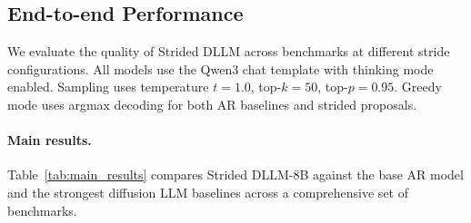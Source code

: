 \subsection{End-to-end Performance}
\label{sec:results}

We evaluate the quality of Strided DLLM across benchmarks at different stride configurations. All models use the Qwen3 chat template with thinking mode enabled. Sampling uses temperature $t{=}1.0$, top-$k{=}50$, top-$p{=}0.95$. Greedy mode uses argmax decoding for both AR baselines and strided proposals.

\paragraph{Main results.}
Table~\ref{tab:main_results} compares Strided DLLM-8B against the base AR model and the strongest diffusion LLM baselines across a comprehensive set of benchmarks.

